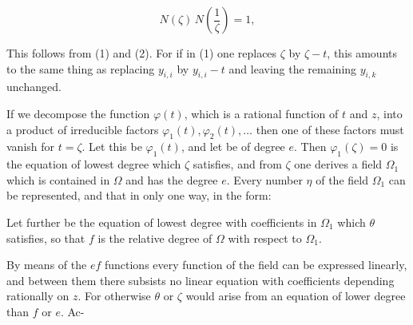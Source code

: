\[
N(\zeta)\,N\left(\frac{1}{\zeta}\right) = 1,
\]


This follows from (1) and (2). For if in (1) one replaces $\zeta$ by $\zeta - t$, this amounts to the same thing as replacing $y_{i,i}$ by $y_{i,i} - t$ and leaving the remaining $y_{i,k}$ unchanged.

If we decompose the function $\varphi(t)$, which is a rational function of $t$ and $z$, into a product of irreducible factors $\varphi_1(t), \varphi_2(t), \dots$ then one of these factors must vanish for $t = \zeta$. Let this be $\varphi_1(t)$, and let
be of degree $e$. Then $\varphi_1(\zeta) = 0$ is the equation of lowest degree which $\zeta$ satisfies, and from $\zeta$ one derives a field $\Omega_1$ which is contained in $\Omega$ and has the degree $e$. Every number $\eta$ of the field $\Omega_1$ can be represented, and that in only one way, in the form:

Let further
be the equation of lowest degree with coefficients in $\Omega_1$ which $\theta$ satisfies, so that $f$ is the relative degree of $\Omega$ with respect to $\Omega_1$.

By means of the $ef$ functions
every function of the field can be expressed linearly, and between them there subsists no linear equation with coefficients depending rationally on $z$. For otherwise $\theta$ or $\zeta$ would arise from an equation of lower degree than $f$ or $e$. Ac-
